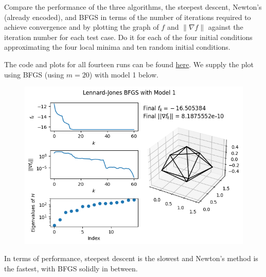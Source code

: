 \documentclass{../kin_math}
\begin{document}
\begin{questions}
  Compare the performance of the three algorithms, the steepest descent, Newton's (already encoded), and BFGS in terms of the number of iterations required to achieve convergence and by plotting the graph of $f$ and $\lVert \nabla f \rVert$ against the iteration number for each test case. Do it for each of the four initial conditions approximating the four local minima and ten random initial conditions.
  \begin{solution}
    The code and plots for all fourteen runs can be found \href{https://github.com/elijahkin/amsc660/blob/main/hw10/hw10.ipynb}{here}. We supply the plot using BFGS (using $m = 20$) with model 1 below.
    \begin{figure}
      \centering
      \includegraphics[scale=0.8]{lennard_jones.png}
    \end{figure}
    In terms of performance, steepest descent is the slowest and Newton's method is the fastest, with BFGS solidly in between.
  \end{solution}


\end{questions}
\end{document}
